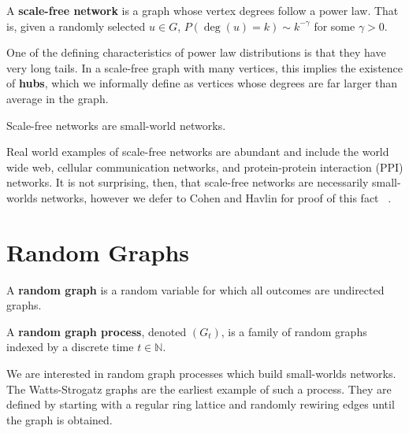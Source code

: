 
\begin{definition}
  A \textbf{scale-free network} is a graph whose vertex degrees follow a power
  law. That is, given a randomly selected $u \in G$, $P(\deg(u) = k) \sim
  k^{-\gamma}$ for some $\gamma > 0$.
\end{definition}

One of the defining characteristics of power law distributions is that they have
very long tails. In a scale-free graph with many vertices, this implies the
existence of \textbf{hubs}, which we informally define as vertices whose degrees
are far larger than average in the graph.

\begin{theorem}
  Scale-free networks are small-world networks.
\end{theorem}

Real world examples of scale-free networks are abundant and include the world
wide web, cellular communication networks, and protein-protein interaction (PPI)
networks. It is not surprising, then, that scale-free networks are necessarily
small-worlds networks, however we defer to Cohen and Havlin for proof of this
fact ~\cite{PhysRevLett.90.058701}.


\section{Random Graphs}


\begin{definition}
  A \textbf{random graph} is a random variable for which all outcomes are
  undirected graphs.

  A \textbf{random graph process}, denoted $(G_t)$, is a family of random graphs
  indexed by a discrete time $t \in \mathbb{N}$.
\end{definition}

We are interested in random graph processes which build small-worlds networks.
The Watts-Strogatz graphs are the earliest example of such a process. They are
defined by starting with a regular ring lattice and randomly rewiring edges
until the graph is obtained.

